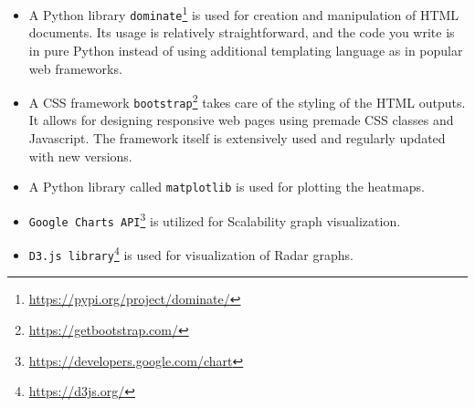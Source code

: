 \begin{itemize}
    \item A Python library \texttt{dominate}\footnote{\url{https://pypi.org/project/dominate/}} is used for creation and manipulation of HTML documents. Its usage is relatively straightforward, and the code you write is in pure Python instead of using additional templating language as in popular web frameworks.
    \item A CSS framework \texttt{bootstrap}\footnote{\url{https://getbootstrap.com/}} takes care of the styling of the HTML outputs. It allows for designing responsive web pages using premade CSS classes and Javascript. The framework itself is extensively used and regularly updated with new versions.
    \item A Python library called \texttt{matplotlib} is used for plotting the heatmaps.
    \item \texttt{Google Charts API}\footnote{\url{https://developers.google.com/chart}} is utilized for Scalability graph visualization.
    \item \texttt{D3.js library}\footnote{\url{https://d3js.org/}}  is used for visualization of Radar graphs.
\end{itemize}

